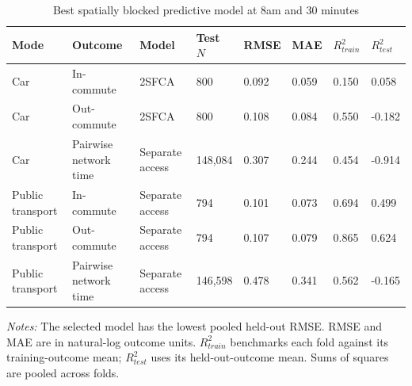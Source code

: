 \begin{table}[htbp]
\centering
\scriptsize
\caption{Best spatially blocked predictive model at 8am and 30 minutes}
\label{tab:prediction}
\begin{tabular}{llllllll}
\toprule
Mode & Outcome & Model & Test $N$ & RMSE & MAE & $R^2_{train}$ & $R^2_{test}$ \\
\midrule
Car & In-commute & 2SFCA & 800 & 0.092 & 0.059 & 0.150 & 0.058 \\
Car & Out-commute & 2SFCA & 800 & 0.108 & 0.084 & 0.550 & -0.182 \\
Car & Pairwise network time & Separate access & 148,084 & 0.307 & 0.244 & 0.454 & -0.914 \\
Public transport & In-commute & Separate access & 794 & 0.101 & 0.073 & 0.694 & 0.499 \\
Public transport & Out-commute & Separate access & 794 & 0.107 & 0.079 & 0.865 & 0.624 \\
Public transport & Pairwise network time & Separate access & 146,598 & 0.478 & 0.341 & 0.562 & -0.165 \\
\bottomrule
\end{tabular}
\par\vspace{2pt}
\begin{minipage}{0.96\linewidth}\footnotesize\textit{Notes:} The selected model has the lowest pooled held-out RMSE. RMSE and MAE are in natural-log outcome units. $R^2_{train}$ benchmarks each fold against its training-outcome mean; $R^2_{test}$ uses its held-out-outcome mean. Sums of squares are pooled across folds.
\end{minipage}
\end{table}
